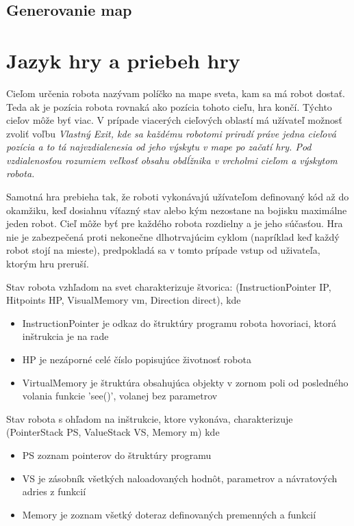 \subsection{Generovanie map}%
\section{Jazyk hry a priebeh hry} %
\begin{definicia}
Cieľom určenia robota nazývam políčko na mape sveta, kam sa má robot dostať. Teda ak je pozícia robota rovnaká ako pozícia tohoto cieľu, hra končí. Týchto cieľov môže byť viac. V prípade viacerých cieľových oblastí má užívateľ možnosť zvoliť voľbu \it{Vlastný Exit}, kde sa každému robotomi priradí práve jedna cieľová pozícia a to tá najvzdialenesia od jeho výskytu v mape po začatí hry.
Pod vzdialenosťou rozumiem veľkosť obsahu obdĺžnika v vrcholmi cieľom a výskytom robota. %
\end{definicia}

Samotná hra prebieha tak, že roboti vykonávajú užívateľom definovaný kód až do okamžiku, keď dosiahnu víťazný stav alebo kým nezostane na bojisku maximálne jeden robot. Cieľ môže byť pre každého robota rozdielny a je jeho súčasťou. Hra nie je zabezpečená proti nekonečne dlhotrvajúcim cyklom (napríklad keď každý robot stojí na mieste), predpokladá sa v tomto prípade vstup od uživateľa, ktorým hru preruší.

\begin{definicia}
Stav robota vzhľadom na svet charakterizuje štvorica: (InstructionPointer IP, Hitpoints HP, VisualMemory vm, Direction direct), kde 
\begin{itemize}
\item InstructionPointer je odkaz do štruktúry programu robota hovoriaci, ktorá inštrukcia je na rade
\item HP je nezáporné celé číslo popisujúce životnosť robota
\item VirtualMemory je štruktúra obsahujúca objekty v zornom poli od posledného volania funkcie 'see()', volanej bez parametrov 
\end{itemize}
Stav robota s ohľadom na inštrukcie, ktore vykonáva, charakterizuje (PointerStack PS, ValueStack VS, Memory m) kde
\begin{itemize}
\item PS zoznam pointerov do štruktúry programu
\item VS je zásobník všetkých naloadovaných hodnôt, parametrov  a návratových adries z funkcií
\item Memory je zoznam všetký doteraz definovaných premenných a funkcií
\end{itemize}
\label{StavRobota}
\end{definicia}

